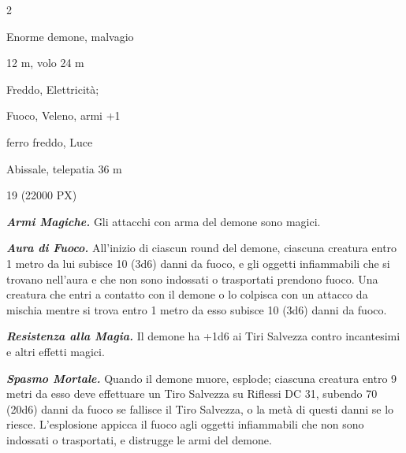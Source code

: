 \begin{multicols}{2}
{
\begin{description}[noitemsep, topsep=0pt, parsep=0pt, partopsep=0pt, itemsep=1pt, leftmargin=2.35cm,  labelwidth=2.2cm, itemindent=0cm, listparindent=0pt] %
\setlength{\baselineskip}{10pt}
\item[\textbf{Taglia/Tipo}] Enorme demone, malvagio
\item[\textbf{Caratt.}] 
\item[\textbf{Punti Ferita}] 
\item[\textbf{Movimento}] 12 m, volo 24 m
\item[\textbf{Tiri Salvez.}] 
\item[\textbf{Res. Danni}] Freddo, Elettricità;
\item[\textbf{Imm. Danni}] Fuoco, Veleno, armi +1
\item[\textbf{Vulnerabilità}] ferro freddo, Luce
\item[\textbf{Sensi}] 
\item[\textbf{Linguaggi}] Abissale, telepatia 36 m
\item[\textbf{Sfida}] 19 (22000 PX)
\end{description}
\smallskip

\emph{\textbf{Armi Magiche.}} Gli attacchi con arma del demone sono magici.

\emph{\textbf{Aura di Fuoco.}} All'inizio di ciascun round del demone, ciascuna creatura entro 1 metro da lui subisce 10 (3d6) danni da fuoco, e gli oggetti infiammabili che si trovano nell'aura e che non sono indossati o trasportati prendono fuoco. Una creatura che entri a contatto con il demone o lo colpisca con un attacco da mischia mentre si trova entro 1 metro da esso subisce 10 (3d6) danni da fuoco.

\emph{\textbf{Resistenza alla Magia.}} Il demone ha +1d6 ai Tiri Salvezza contro incantesimi e altri effetti magici.

\emph{\textbf{Spasmo Mortale.}} Quando il demone muore, esplode; ciascuna creatura entro 9 metri da esso deve effettuare un Tiro Salvezza su Riflessi DC 31, subendo 70 (20d6) danni da fuoco se fallisce il Tiro Salvezza, o la metà di questi danni se lo riesce. L'esplosione appicca il fuoco agli oggetti infiammabili che non sono indossati o trasportati, e distrugge le armi del demone.

}
\end{multicols}
